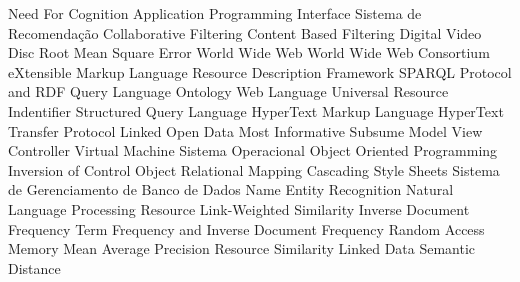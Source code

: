 \begin{acronym}[ACRONYM] 

 {Need For Cognition}
 {Application Programming Interface}
 {Sistema de Recomendação}
 {Collaborative Filtering}
 {Content Based Filtering}
 {Digital Video Disc}
 {Root Mean Square Error}
 {World Wide Web}
 {World Wide Web Consortium}
 {eXtensible Markup Language}
 {Resource Description Framework}
 {SPARQL Protocol and RDF Query Language}
 {Ontology Web Language}
 {Universal Resource Indentifier}
 {Structured Query Language}
 {HyperText Markup Language}
 {HyperText Transfer Protocol}
 {Linked Open Data}
 {Most Informative Subsume}
 {Model View Controller}
 {Virtual Machine}
 {Sistema Operacional}
 {Object Oriented Programming}
 {Inversion of Control}
 {Object Relational Mapping}
 {Cascading Style Sheets}
 {Sistema de Gerenciamento de Banco de Dados}
 {Name Entity Recognition}
 {Natural Language Processing}
 {Resource Link-Weighted Similarity}
 {Inverse Document Frequency}
 {Term Frequency and Inverse Document Frequency}
 {Random Access Memory}
 {Mean Average Precision}
 {Resource Similarity}
 {Linked Data Semantic Distance}
    
\end{acronym}